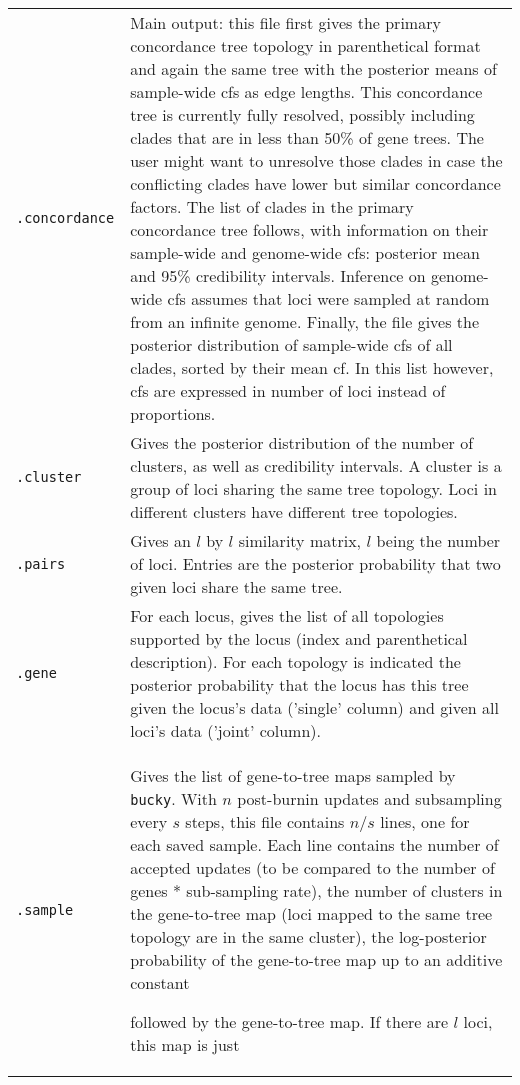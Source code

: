 \documentclass[12pt,english,final,letterpaper]{article}
\newcommand{\com}[1]{}
\begin{document}
\noindent
\begin{tabular}{l|p{5.1in}}
{\tt .concordance}&Main output: 
this file first gives the primary concordance tree topology in parenthetical 
format and again the same tree with the posterior means of 
sample-wide {\sc cf}s  as edge lengths.
This concordance tree is currently fully resolved, possibly including
clades that are in less than 50\% of gene trees. The user might want
to unresolve those clades in case the conflicting clades have lower
but similar concordance factors.
The list of clades in the primary concordance tree follows, with 
information on their sample-wide and genome-wide {\sc cf}s: 
posterior mean and 95\% credibility intervals. Inference on 
genome-wide {\sc cf}s assumes that loci were sampled at random
from an infinite genome.
Finally, the file gives the posterior distribution of sample-wide
{\sc cf}s of all clades, sorted by their mean {\sc cf}. 
In this list however, {\sc cf}s are expressed in number of loci 
instead of proportions. \\
{\tt .cluster}&Gives the posterior distribution of the number of 
clusters, as well as credibility intervals. A cluster is a group of loci 
sharing the same tree topology. Loci in different clusters have different 
tree topologies.\\
{\tt .pairs}&Gives an $l$ by $l$ similarity matrix, $l$ being the number 
of loci. Entries are the posterior probability that two given loci share 
the same tree.\\
{\tt .gene}& For each locus, gives the list of all topologies 
supported by the locus (index and parenthetical description). For each
topology is indicated the posterior probability that the locus has this
tree given the locus's data ('single' column) and given all loci's
data ('joint' column).\\
{\tt .sample}& Gives the list of gene-to-tree maps sampled by 
{\tt bucky}. With $n$ post-burnin updates and subsampling every $s$ steps, 
this file contains $n/s$ lines, one for each saved sample. Each line contains 
the number of accepted updates (to be compared to the number of genes * 
sub-sampling rate), 
the number of clusters in the gene-to-tree map (loci mapped to the same 
tree topology are in the same cluster), 
the log-posterior probability of the gene-to-tree map 
up to an additive constant
\com{fixit: NOT sure at all. Bret: please check!}
followed by the gene-to-tree map. If there are $l$ loci, this map is just 

\end{tabular}
\end{document}

